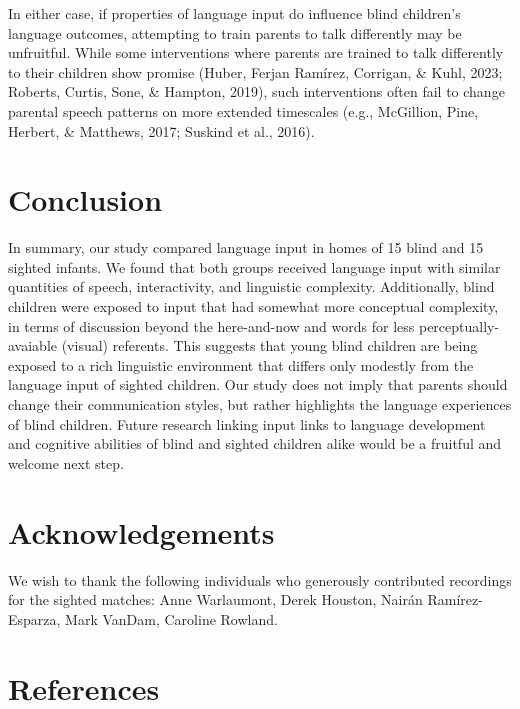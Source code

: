 \documentclass[
  man]{apa6}
\begin{document}
In either case, if properties of language input do influence blind children's language outcomes, attempting to train parents to talk differently may be unfruitful. While some interventions where parents are trained to talk differently to their children show promise (Huber, Ferjan Ramírez, Corrigan, \& Kuhl, 2023; Roberts, Curtis, Sone, \& Hampton, 2019), such interventions often fail to change parental speech patterns on more extended timescales (e.g., McGillion, Pine, Herbert, \& Matthews, 2017; Suskind et al., 2016).

\hypertarget{conclusion}{%
\section{Conclusion}\label{conclusion}}

In summary, our study compared language input in homes of 15 blind and 15 sighted infants. We found that both groups received language input with similar quantities of speech, interactivity, and linguistic complexity. Additionally, blind children were exposed to input that had somewhat more conceptual complexity, in terms of discussion beyond the here-and-now and words for less perceptually-avaiable (visual) referents. This suggests that young blind children are being exposed to a rich linguistic environment that differs only modestly from the language input of sighted children. Our study does not imply that parents should change their communication styles, but rather highlights the language experiences of blind children. Future research linking input links to language development and cognitive abilities of blind and sighted children alike would be a fruitful and welcome next step.

\hypertarget{acknowledgements}{%
\section{Acknowledgements}\label{acknowledgements}}

We wish to thank the following individuals who generously contributed recordings for the sighted matches: Anne Warlaumont, Derek Houston, Nairán Ramírez-Esparza, Mark VanDam, Caroline Rowland.

\hypertarget{references}{%
\section*{References}\label{references}}
\end{document}
